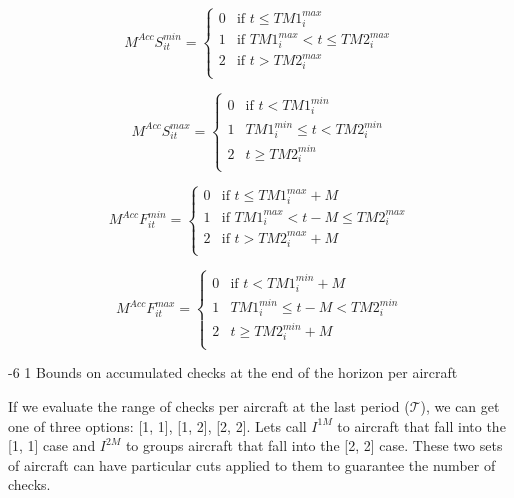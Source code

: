 \documentclass[a4paper,onecolumn,fleqn]{article}
\makeatletter
\renewcommand\section{\@startsection{section}{1}{\z@}%
                       {-6\p@ \@plus -0\p@ \@minus -0\p@}%
                       {2\p@ \@plus 0\p@ \@minus 0\p@}%
                       {\normalsize\textbf}}
\renewcommand\section{\@startsection{section}{2}{\z@}%
                       {-6\p@ \@plus -0\p@ \@minus -0\p@}%
                       {2\p@ \@plus 0\p@ \@minus 0\p@}%
                       {\normalsize\textbf}}
\renewcommand\section{\@startsection{section}{3}{\z@}%
                       {-6\p@ \@plus -0\p@ \@minus -0\p@}%
                       {1\p@ \@plus 0\p@ \@minus 0\p@}%
                       {\normalsize\itshape\bfseries}}
\makeatother
\begin{document}
  \begin{multicols}{2}
  \[
   M^{Acc}S^{min}_{it} = 
    \begin{cases} 
     0 & \text{if } t \le TM1^{max}_i\\
     1 & \text{if } TM1^{max}_i < t \le TM2^{max}_i \\
     2 & \text{if } t > TM2^{max}_i \\
    \end{cases}
  \]

  \[
   M^{Acc}S^{max}_{it} = 
    \begin{cases} 
     0 & \text{if } t < TM1^{min}_i \\
     1 & TM1^{min}_i \le t < TM2^{min}_i \\
     2 & t \ge TM2^{min}_i \\
    \end{cases}
  \]

  \columnbreak

  \[
   M^{Acc}F^{min}_{it} = 
    \begin{cases} 
     0 & \text{if } t \le TM1^{max}_i + M\\
     1 & \text{if } TM1^{max}_i < t - M \le TM2^{max}_i \\
     2 & \text{if } t > TM2^{max}_i + M \\
    \end{cases}
  \]

  \[
   M^{Acc}F^{max}_{it} = 
    \begin{cases} 
     0 & \text{if } t < TM1^{min}_i + M\\
     1 & TM1^{min}_i \le t - M < TM2^{min}_i\\
     2 & t \ge TM2^{min}_i + M\\
    \end{cases}
  \]

  \end{multicols}

\section{Bounds on accumulated checks at the end of the horizon per aircraft}

  If we evaluate the range of checks per aircraft at the last period ($\mathcal{T}$), we can get one of three options: [1, 1], [1, 2], [2, 2]. Lets call $I^{1M}$ to aircraft that fall into the [1, 1] case and $I^{2M}$ to groups aircraft that fall into the [2, 2] case. These two sets of aircraft can have particular cuts applied to them to guarantee the number of checks.
\end{document}
